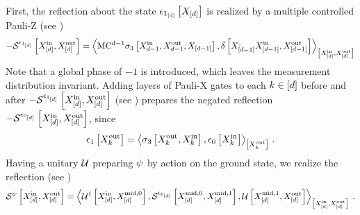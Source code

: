 First, the reflection about the state $\epsilon_{1_{[d]}}\left[X_{[d]}\right]$ is realized by a multiple controlled Pauli-Z (see )
\begin{align*}
    -\mathcal{S}^{\epsilon_{1_{[d]}}}\left[X_{[d]}^{\mathrm{in}},X_{[d]}^{\mathrm{out}}\right]
    = \left\langle 
        \mathrm{MC^{d-1}}\sigma_3\left[X_{d-1}^{\mathrm{in}},X_{d-1}^{\mathrm{out}},X_{[d-1]}\right],
        \delta\left[X_{[d-1]}^{,}X_{[d-1]}^{\mathrm{in}},X_{[d-1]}^{\mathrm{out}}\right]
    \right\rangle_{\left[ X_{[d]}^{\mathrm{in}},X_{[d]}^{\mathrm{out}} \right]}
\end{align*}
Note that a global phase of $-1$ is introduced, which leaves the measurement distribution invariant.
Adding layers of Pauli-X gates to each $k\in[d]$ before and after $-\mathcal{S}^{\epsilon_{1_{[d]}}}\left[X_{[d]}^{\mathrm{in}},X_{[d]}^{\mathrm{out}}\right]$ (see ) prepares the negated reflection $-\mathcal{S}^{\epsilon_{0_{[d]}}}\left[X_{[d]}^{\mathrm{in}},X_{[d]}^{\mathrm{out}}\right]$, since
\begin{align*}
    \epsilon_{1}\left[X_{k}^{\mathrm{out}}\right]
    = \left\langle 
        \sigma_3\left[X_{k}^{\mathrm{out}},X_{k}^{\mathrm{in}}\right],\epsilon_{0}\left[X_{k}^{\mathrm{in}}\right]
    \right\rangle_{\left[ X_{k}^{\mathrm{out}} \right]} \, .
\end{align*}
Having a unitary $\mathcal{U}$ preparing $\psi$ by action on the ground state, we realize the reflection (see )
\begin{align*}
    \mathcal{S}^{\psi}\left[X_{[d]}^{\mathrm{in}},X_{[d]}^{\mathrm{out}}\right]
    = \left\langle 
        \mathcal{U}^{\dagger}\left[X_{[d]}^{\mathrm{in}},X_{[d]}^{\mathrm{mid},0}\right],
        \mathcal{S}^{\epsilon_{0_{[d]}}}\left[X_{[d]}^{\mathrm{mid},0},X_{[d]}^{\mathrm{mid},1}\right],
        \mathcal{U}\left[X_{[d]}^{\mathrm{mid},1},X_{[d]}^{\mathrm{out}}\right]
    \right\rangle_{\left[ X_{[d]}^{\mathrm{in}},X_{[d]}^{\mathrm{out}} \right]} \, .
\end{align*}


